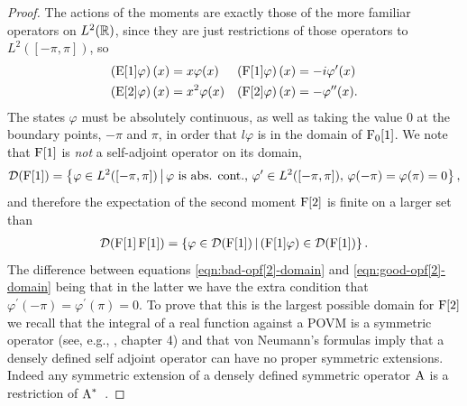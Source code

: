 \begin{proof}
The actions of the moments are exactly those of the more familiar operators on $L^2(\mathbb{R})$, since they are just restrictions of those operators to $L^2([-\pi,\pi])$, so
\begin{align}
  \left(\operatorname{E}[1]\varphi\right)(x) &= x\varphi(x) & \left(\operatorname{F}[1]\varphi\right)(x) &= -i\varphi^\prime(x)\\
  \left(\operatorname{E}[2]\varphi\right)(x) &= x^2\varphi(x) & \left(\operatorname{F}[2]\varphi\right)(x) &= -\varphi^{\prime\prime}(x). 
\end{align}
The states $\varphi$ must be absolutely continuous, as well as taking the value $0$ at the boundary points, $-\pi$ and $\pi$, in order that $l\varphi$ is in the domain of $\operatorname{F}_0[1]$. We note that $\operatorname{F}[1]$ is \emph{not} a self-adjoint operator on its domain,
\begin{align}
  \mathcal{D}(\operatorname{F}[1]) = \left\{\varphi\in L^2([-\pi,\pi])\, \middle|\, \varphi \text{ is abs. cont., } \varphi^\prime\in L^2([-\pi,\pi]),\, \varphi(-\pi) = \varphi(\pi) = 0\right\},
\end{align}
and therefore the expectation of the second moment $\operatorname{F}[2]$ is finite on a larger set than 
\begin{align}\label{eqn:bad-opf[2]-domain}
  \mathcal{D}(\operatorname{F}[1]\operatorname{F}[1]) = \left\{\varphi\in\mathcal{D}(\operatorname{F}[1])\,\middle|\,\left(\operatorname{F}[1]\varphi\right)\in\mathcal{D}(\operatorname{F}[1])\right\}.
\end{align}
The difference between equations \eqref{eqn:bad-opf[2]-domain} and \eqref{eqn:good-opf[2]-domain} being that in the latter we have the extra condition that $\varphi^\prime(-\pi) = \varphi^\prime(\pi) = 0$. To prove that this is the largest possible domain for $\operatorname{F}[2]$ we recall that the integral of a real function against a POVM is a symmetric operator (see, e.g., \cite{quantum-measurement-busch-et-al}, chapter 4) and that von Neumann's formulas imply that a densely defined self adjoint operator can have no proper symmetric extensions. Indeed any symmetric extension of a densely defined symmetric operator $\operatorname{A}$ is a restriction of $\operatorname{A}^*$~\cite{akhiezer-glazman-lin-ops-hilb-space}.


\end{proof}
